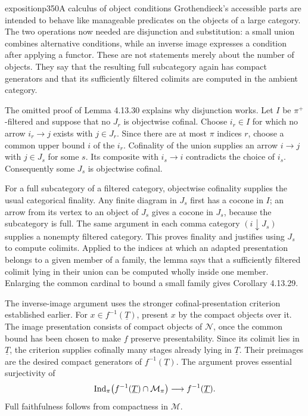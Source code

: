 \begin{dcomment}{exposition}{p350}{A calculus of object conditions}
Grothendieck's accessible parts are intended to behave like manageable predicates on the objects of a large category. The two operations now needed are disjunction and substitution: a small union combines alternative conditions, while an inverse image expresses a condition after applying a functor. These are not statements merely about the number of objects. They say that the resulting full subcategory again has compact generators and that its sufficiently filtered colimits are computed in the ambient category.

The omitted proof of Lemma 4.13.30 explains why disjunction works. Let $I$ be $\pi^+$-filtered and suppose that no $J_r$ is objectwise cofinal. Choose $i_r\in I$ for which no arrow $i_r\to j$ exists with $j\in J_r$. Since there are at most $\pi$ indices $r$, choose a common upper bound $i$ of the $i_r$. Cofinality of the union supplies an arrow $i\to j$ with $j\in J_s$ for some $s$. Its composite with $i_s\to i$ contradicts the choice of $i_s$. Consequently some $J_s$ is objectwise cofinal.

For a full subcategory of a filtered category, objectwise cofinality supplies the usual categorical finality. Any finite diagram in $J_s$ first has a cocone in $I$; an arrow from its vertex to an object of $J_s$ gives a cocone in $J_s$, because the subcategory is full. The same argument in each comma category $(i\downarrow J_s)$ supplies a nonempty filtered category. This proves finality and justifies using $J_s$ to compute colimits. Applied to the indices at which an adapted presentation belongs to a given member of a family, the lemma says that a sufficiently filtered colimit lying in their union can be computed wholly inside one member. Enlarging the common cardinal to bound a small family gives Corollary 4.13.29.

The inverse-image argument uses the stronger cofinal-presentation criterion established earlier. For $x\in f^{-1}(\underline T)$, present $x$ by the compact objects over it. The image presentation consists of compact objects of $\mathcal N$, once the common bound has been chosen to make $f$ preserve presentability. Since its colimit lies in $\underline T$, the criterion supplies cofinally many stages already lying in $\underline T$. Their preimages are the desired compact generators of $f^{-1}(\underline T)$. The argument proves essential surjectivity of
\[
 \operatorname{Ind}_\pi\bigl(f^{-1}(\underline T)\cap\mathcal M_\pi\bigr)
 \longrightarrow f^{-1}(\underline T).
\]
Full faithfulness follows from compactness in $\mathcal M$.


\end{dcomment}
